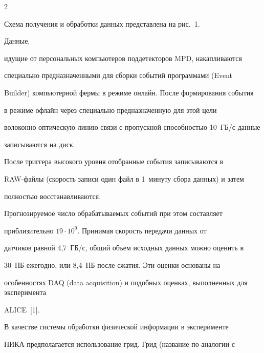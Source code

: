 \begin{multicols}{2}





   Схема получения и обработки данных пред\-став\-ле\-на на рис.~1. 


   


   Данные, 


идущие от персональных компьютеров поддетекторов MPD, накапливаются 


специально предназначенными для сборки событий программами (Event 


Builder) компьютерной фермы в режиме онлайн. После формирования события 


в режиме офлайн через специально предназначенную для этой цели 


во\-ло\-кон\-но-оп\-ти\-че\-скую линию связи с пропускной способностью 10~ГБ/с данные 


записываются на диск.


   


   После триггера высокого уровня отобранные события записываются в 


   RAW-фай\-лы (скорость записи один файл в 1~минуту сбора данных) и затем 


полностью восстанавливаются. 


   


   Прогнозируемое число обрабатываемых событий при этом составляет 


приблизительно $19\cdot 10^9$. Принимая скорость передачи данных от 


датчиков равной 4,7~ГБ/с, общий объем исходных данных можно оценить в 


30~ПБ ежегодно, или 8,4~ПБ после сжатия. Эти оценки основаны на 


особенностях DAQ (data acquisition) и подобных оценках, выполненных для эксперимента 


ALICE~[1].


   








   В качестве системы обработки физической информации в эксперименте 


НИКА предполагается использование грид. Грид (название по аналогии с 



\end{multicols}

